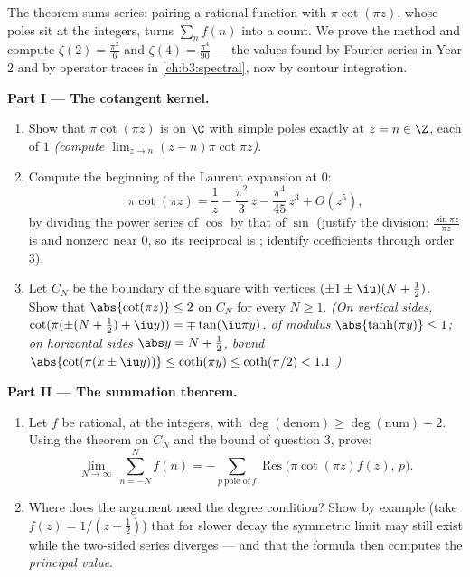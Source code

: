 \begin{problem}\label{pb:b3:residues:1}
The  theorem sums series: pairing a rational function
with $\pi\cot(\pi z)$, whose poles sit at the integers, turns
$\sum_{n}f(n)$ into a  count. We prove the method and
compute $\zeta(2) = \frac{\pi^2}{6}$ and $\zeta(4) =
\frac{\pi^4}{90}$ --- the values found by Fourier series in
Year 2 and by operator traces in \cref{ch:b3:spectral}, now by
contour integration.

\medskip
\noindent\textbf{Part I --- The cotangent kernel.}
\begin{enumerate}
  \item Show that $\pi\cot(\pi z)$ is  on $\C$ with
        simple poles exactly at $z = n \in \Z$, each of
         $1$ \emph{(compute
        $\lim_{z\to n}(z-n)\pi\cot\pi z$)}.
  \item Compute the beginning of the Laurent expansion at $0$:
        \[
        \pi\cot(\pi z) = \frac1z - \frac{\pi^2}{3}\,z -
        \frac{\pi^4}{45}\,z^3 + O(z^5) ,
        \]
        by dividing the power series of $\cos$ by that of
        $\sin$ (justify the division: $\frac{\sin\pi z}{\pi z}$
        is  and nonzero near $0$, so its
        reciprocal is ; identify coefficients
        through order $3$).
  \item Let $C_N$ be the boundary of the square with vertices
        $(\pm1\pm\iu)(N + \frac12)$. Show that
        $\abs{\cot(\pi z)} \leq 2$ on $C_N$ for every $N \geq
        1$. \emph{(On vertical sides, $\cot(\pi(\pm(N +
        \frac12) + \iu y)) = \mp\tan(\iu\pi y)$, of modulus
        $\abs{\tanh(\pi y)} \leq 1$; on horizontal sides
        $\abs y = N + \frac12$, bound
        $\abs{\cot(\pi(x\pm\iu y))} \leq \coth(\pi y) \leq
        \coth(\pi/2) < 1.1$.)}
\end{enumerate}

\medskip
\noindent\textbf{Part II --- The summation theorem.}
\begin{enumerate}[resume]
  \item Let $f$ be rational,  at the integers,
        with $\deg(\text{denom}) \geq \deg(\text{num}) + 2$.
        Using the  theorem on $C_N$ and the bound of
        question 3, prove:
        \[
        \lim_{N\to\infty}\ \sum_{n = -N}^{N} f(n)
        = -\sum_{p\ \text{pole of}\ f}
        \operatorname{Res}\bigl(\pi\cot(\pi z)f(z),\,p\bigr).
        \]
  \item Where does the argument need the degree condition?
        Show by example (take $f(z) = 1/(z + \frac12)$)
        that for slower decay the symmetric limit
        may still exist while the two-sided series diverges
        --- and that the formula then computes the
        \emph{principal value}.
\end{enumerate}


\end{problem}
